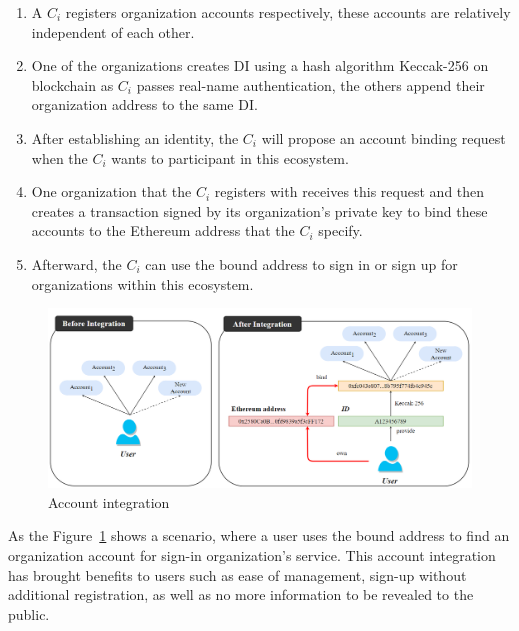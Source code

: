 \renewcommand\labelenumi{(\theenumi)}
\begin{enumerate}[noitemsep, topsep=0pt]
    \item A \(C_i\) registers organization accounts respectively, these accounts are relatively independent of each other.
    \item One of the organizations creates DI using a hash algorithm Keccak-256  on blockchain as \(C_i\) passes real-name authentication, the others append their organization address to the same DI.
    \item After establishing an identity, the \(C_i\) will propose an account binding request when the \(C_i\) wants to participant in this ecosystem.
    \item One organization that the \(C_i\) registers with receives this request and then creates a transaction signed by its organization's private key to bind these accounts to the Ethereum address that the \(C_i\) specify. 
    \item Afterward, the \(C_i\) can use the bound address to sign in or sign up for organizations within this ecosystem.
\end{enumerate}

\begin{figure}[htb]
    \centering
    \includegraphics[height=!,width=1\linewidth,keepaspectratio=true]{figures/account_integration.png}
    \caption{{\footnotesize Account integration}}
    \label{fig:account_integration}
\end{figure}

As the Figure~\ref{fig:account_integration} shows a scenario, where a user uses the bound address to find an organization account for sign-in organization's service.  This account integration has brought benefits to users such as ease of management, sign-up without additional registration, as well as no more information to be revealed to the public.

\newpage
